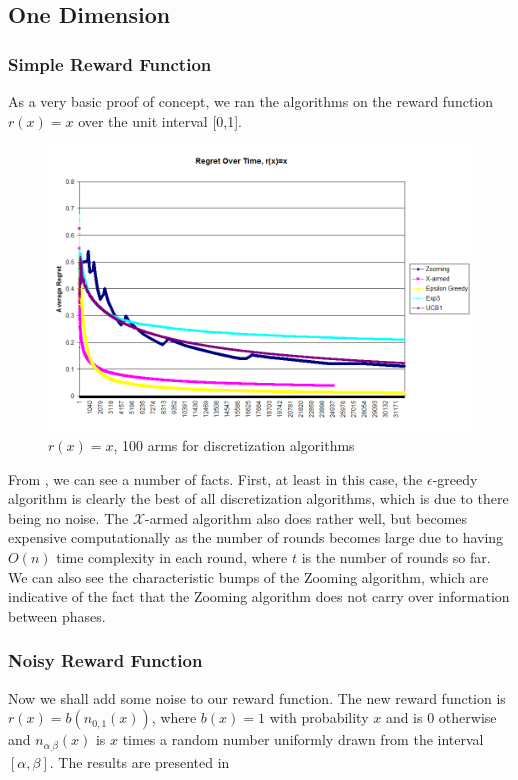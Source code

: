 \subsection{One Dimension}
\subsubsection{Simple Reward Function}
As a very basic proof of concept, we ran the algorithms on the reward
function $r(x) = x$ over the unit interval [0,1].

\begin{figure}[!ht]
  \begin{center}
    \includegraphics[width=\figwidth]{figures/1dsimpleplot.png}
     \caption{$r(x) = x$, 100 arms for discretization
     algorithms}
     \label{fig:1dsimple}
  \end{center}
\end{figure}

From , we can see a number of facts.  First, at 
least in this case, the $\epsilon$-greedy algorithm is clearly the
best of all discretization algorithms, which is due to there being
no noise.  The $\mathcal{X}$-armed algorithm also does rather well,
but becomes expensive computationally as the number of rounds becomes
large due to having $O(n)$ time complexity in each round, where $t$ is
the number of rounds so far.  We can also see the characteristic bumps of
the Zooming algorithm, which are indicative of the fact that the Zooming
algorithm does not carry over information between phases.


\subsubsection{Noisy Reward Function}
Now we shall add some noise to our reward function.  The new reward
function is $r(x) = b(n_{0,1}(x))$, where $b(x) = 1$ with probability
$x$ and is 0 otherwise and $n_{\alpha_,\beta}(x)$ is $x$ times a random
number uniformly drawn from the interval $[\alpha, \beta]$.  The results
are presented in 

